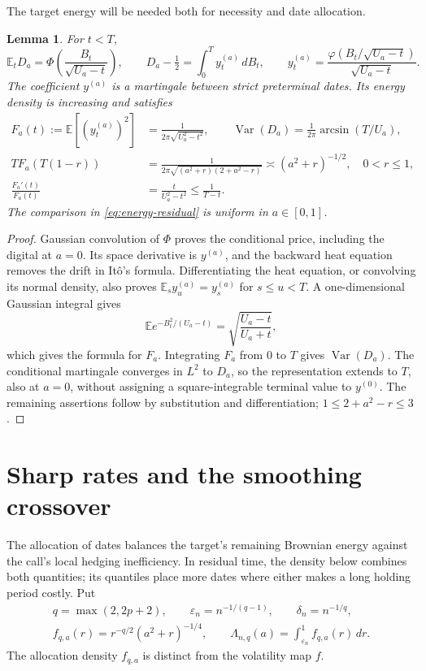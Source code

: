 \documentclass[11pt,a4paper]{amsart}
\theoremstyle{plain}
\newtheorem{lemma}[theorem]{Lemma}
\theoremstyle{definition}
\theoremstyle{remark}
\DeclareMathOperator{\Var}{Var}
\newcommand{\EE}{\mathbb{E}}
\newcommand{\ph}{\varphi}
\newcommand{\eps}{\varepsilon}
\begin{document}
The target energy will be needed both for necessity and date allocation.
\begin{lemma}\label{lem:target}
For $t<T$,
\begin{equation}\label{eq:target-representation}
 \EE_tD_a=\Phi\left(\frac{B_t}{\sqrt{U_a-t}}\right),\qquad
 D_a-\tfrac12=\int_0^T y_t^{(a)}\,dB_t,\qquad
 y_t^{(a)}=\frac{\ph(B_t/\sqrt{U_a-t})}{\sqrt{U_a-t}}.
\end{equation}
The coefficient $y^{(a)}$ is a martingale between strict preterminal dates. Its energy density is increasing and satisfies
\begin{align}
 F_a(t):=\EE[(y_t^{(a)})^2]
 &=\frac1{2\pi\sqrt{U_a^2-t^2}},
 \qquad\Var(D_a)=\frac1{2\pi}\arcsin(T/U_a),\label{eq:target-energy}\\
 TF_a(T(1-r))
 &=\frac1{2\pi\sqrt{(a^2+r)(2+a^2-r)}}
 \asymp(a^2+r)^{-1/2},\quad 0<r\le1,\label{eq:energy-residual}\\
 \frac{F_a'(t)}{F_a(t)}&=\frac{t}{U_a^2-t^2}
 \le\frac1{T-t}.\label{eq:energy-logderivative}
\end{align}
The comparison in \eqref{eq:energy-residual} is uniform in $a\in[0,1]$.
\end{lemma}
\begin{proof}
Gaussian convolution of $\Phi$ proves the conditional price, including the digital at $a=0$. Its space derivative is $y^{(a)}$, and the backward heat equation removes the drift in It\^o's formula. Differentiating the heat equation, or convolving its normal density, also proves $\EE_s y_u^{(a)}=y_s^{(a)}$ for $s\le u<T$. A one-dimensional Gaussian integral gives
\[
 \EE e^{-B_t^2/(U_a-t)}=\sqrt{\frac{U_a-t}{U_a+t}},
\]
which gives the formula for $F_a$. Integrating $F_a$ from $0$ to $T$ gives $\Var(D_a)$. The conditional martingale converges in $L^2$ to $D_a$, so the representation extends to $T$, also at $a=0$, without assigning a square-integrable terminal value to $y^{(0)}$. The remaining assertions follow by substitution and differentiation; $1\le2+a^2-r\le3$.
\end{proof}

\section{Sharp rates and the smoothing crossover}\label{sec:main}

The allocation of dates balances the target's remaining Brownian energy against the call's local hedging inefficiency. In residual time, the density below combines both quantities; its quantiles place more dates where either makes a long holding period costly. Put
\begin{equation}\label{eq:allocation-definitions}
 \begin{gathered}
 q=\max(2,2p+2),\qquad \eps_n=n^{-1/(q-1)},\qquad
 \delta_n=n^{-1/q},\\
 f_{q,a}(r)=r^{-q/2}(a^2+r)^{-1/4},\qquad
 \Lambda_{n,q}(a)=\int_{\eps_n}^1 f_{q,a}(r)\,dr.
 \end{gathered}
\end{equation}
The allocation density $f_{q,a}$ is distinct from the volatility map $f$.
\end{document}

